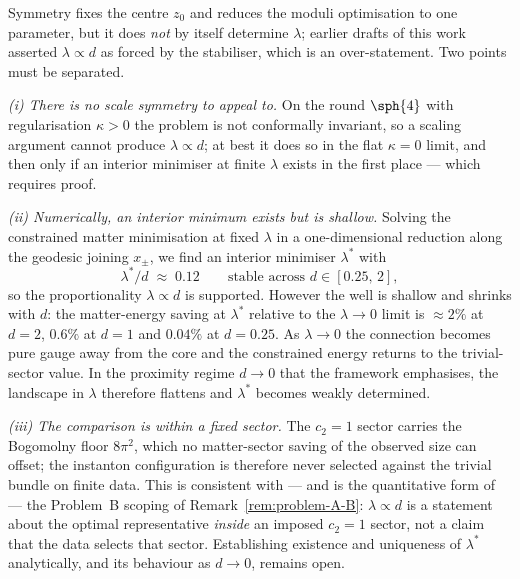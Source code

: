 \begin{remark}
\label{rem:lambda-status}
Symmetry fixes the centre $z_0$ and reduces the moduli optimisation
to one parameter, but it does \emph{not} by itself determine
$\lambda$; earlier drafts of this work asserted
$\lambda\propto d$ as forced by the stabiliser, which is an
over-statement. Two points must be separated.

\emph{(i) There is no scale symmetry to appeal to.} On the round
$\sph{4}$ with regularisation $\kappa>0$ the problem is not
conformally invariant, so a scaling argument cannot produce
$\lambda\propto d$; at best it does so in the flat $\kappa=0$ limit,
and then only if an interior minimiser at finite $\lambda$ exists in
the first place --- which requires proof.

\emph{(ii) Numerically, an interior minimum exists but is shallow.}
Solving the constrained matter minimisation at fixed $\lambda$ in a
one-dimensional reduction along the geodesic joining $x_\pm$, we find
an interior minimiser $\lambda^*$ with
\[
   \lambda^*/d \;\approx\; 0.12
   \qquad\text{stable across } d\in[0.25,\,2],
\]
so the proportionality $\lambda\propto d$ is supported. However the
well is shallow and shrinks with $d$: the matter-energy saving at
$\lambda^*$ relative to the $\lambda\to 0$ limit is $\approx 2\%$ at
$d=2$, $0.6\%$ at $d=1$ and $0.04\%$ at $d=0.25$. As $\lambda\to 0$
the connection becomes pure gauge away from the core and the
constrained energy returns to the trivial-sector value. In the
proximity regime $d\to 0$ that the framework emphasises, the
landscape in $\lambda$ therefore flattens and $\lambda^*$ becomes
weakly determined.

\emph{(iii) The comparison is within a fixed sector.} The $c_2=1$
sector carries the Bogomolny floor $8\pi^2$, which no matter-sector
saving of the observed size can offset; the instanton configuration
is therefore never selected against the trivial bundle on finite
data. This is consistent with --- and is the quantitative form of ---
the Problem~B scoping of Remark~\ref{rem:problem-A-B}: $\lambda\propto
d$ is a statement about the optimal representative \emph{inside} an
imposed $c_2=1$ sector, not a claim that the data selects that
sector. Establishing existence and uniqueness of $\lambda^*$
analytically, and its behaviour as $d\to 0$, remains open.
\end{remark}

